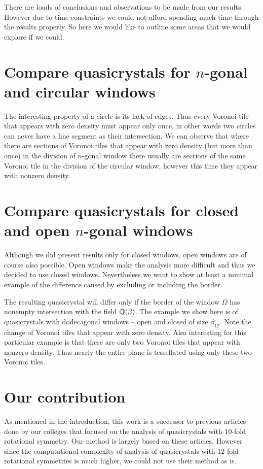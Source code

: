 \documentclass[text.tex]{subfiles}
\begin{document}
There are loads of conclusions and observations to be made from our results. However due to time constraints we could not afford spending much time through the results properly. So here we would like to outline some areas that we would explore if we could. 
\section*{Compare quasicrystals for $n$-gonal and circular windows}
The interesting property of a circle is its lack of edges. Thus every Voronoi tile that appears with zero density must appear only once, in other words two circles can never have a line segment as their intersection. We can observe that where there are sections of Voronoi tiles that appear with zero density (but more than once) in the division of $n$-gonal window there usually are sections of the same Voronoi tile in the division of the circular window, however this time they appear with nonzero density. 

\section*{Compare quasicrystals for closed and open $n$-gonal windows}
Although we did present results only for closed windows, open windows are of course also possible. Open windows make the analysis more difficult and thus we decided to use closed windows. Nevertheless we want to show at least a minimal example of the difference caused by excluding or including the border. 

The resulting quasicrystal will differ only if the border of the window $\overline{\Omega}$ has nonempty intersection with the field $\mathbb{Q}(\beta)$. The example we show here is of quasicrystals with dodecagonal windows -- open and closed of size $\beta_{12}$. Note the change of Voronoi tiles that appear with zero density. Also interesting for this particular example is that there are only two Voronoi tiles that appear with nonzero density. Thus nearly the entire plane is tessellated using only these two Voronoi tiles. 

\section*{Our contribution}
As mentioned in the introduction, this work is a successor to previous articles done by our colleges that focused on the analysis of quasicrystals with $10$-fold rotational symmetry. Our method is largely based on these articles. However since the computational complexity of analysis of quasicrystals with $12$-fold rotational symmetries is much higher, we could not use their method as is. 
\end{document}
